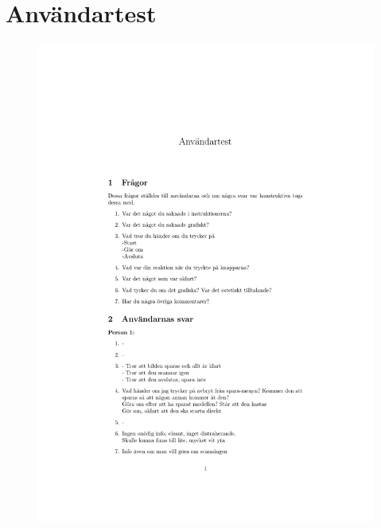 \documentclass[a4paper,12pt,oneside,final]{extbook}
\begin{document}
\newpage
\chapter{Användartest}\label{app:anvtest}
\begin{figure}[ht]
\includegraphics{anvandartest.pdf}
\end{figure}
\end{document}
